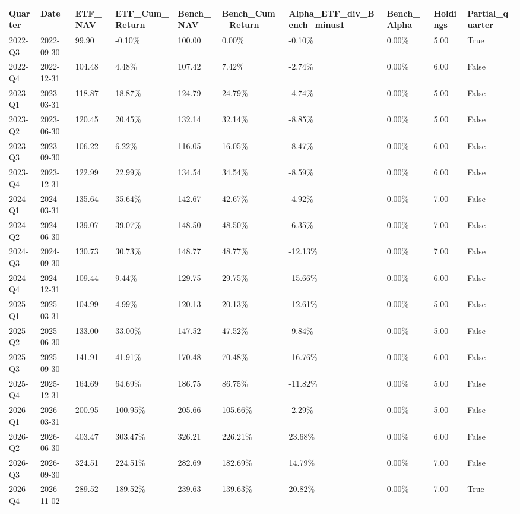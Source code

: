 \begin{longtable}{llllllllll}
Quarter & Date & ETF\_NAV & ETF\_Cum\_Return & Bench\_NAV & Bench\_Cum\_Return & Alpha\_ETF\_div\_Bench\_minus1 & Bench\_Alpha & Holdings & Partial\_quarter \\
\hline
2022-Q3 & 2022-09-30 & 99.90 & -0.10\% & 100.00 & 0.00\% & -0.10\% & 0.00\% & 5.00 & True \\
2022-Q4 & 2022-12-31 & 104.48 & 4.48\% & 107.42 & 7.42\% & -2.74\% & 0.00\% & 6.00 & False \\
2023-Q1 & 2023-03-31 & 118.87 & 18.87\% & 124.79 & 24.79\% & -4.74\% & 0.00\% & 5.00 & False \\
2023-Q2 & 2023-06-30 & 120.45 & 20.45\% & 132.14 & 32.14\% & -8.85\% & 0.00\% & 5.00 & False \\
2023-Q3 & 2023-09-30 & 106.22 & 6.22\% & 116.05 & 16.05\% & -8.47\% & 0.00\% & 6.00 & False \\
2023-Q4 & 2023-12-31 & 122.99 & 22.99\% & 134.54 & 34.54\% & -8.59\% & 0.00\% & 6.00 & False \\
2024-Q1 & 2024-03-31 & 135.64 & 35.64\% & 142.67 & 42.67\% & -4.92\% & 0.00\% & 7.00 & False \\
2024-Q2 & 2024-06-30 & 139.07 & 39.07\% & 148.50 & 48.50\% & -6.35\% & 0.00\% & 7.00 & False \\
2024-Q3 & 2024-09-30 & 130.73 & 30.73\% & 148.77 & 48.77\% & -12.13\% & 0.00\% & 7.00 & False \\
2024-Q4 & 2024-12-31 & 109.44 & 9.44\% & 129.75 & 29.75\% & -15.66\% & 0.00\% & 6.00 & False \\
2025-Q1 & 2025-03-31 & 104.99 & 4.99\% & 120.13 & 20.13\% & -12.61\% & 0.00\% & 5.00 & False \\
2025-Q2 & 2025-06-30 & 133.00 & 33.00\% & 147.52 & 47.52\% & -9.84\% & 0.00\% & 5.00 & False \\
2025-Q3 & 2025-09-30 & 141.91 & 41.91\% & 170.48 & 70.48\% & -16.76\% & 0.00\% & 6.00 & False \\
2025-Q4 & 2025-12-31 & 164.69 & 64.69\% & 186.75 & 86.75\% & -11.82\% & 0.00\% & 5.00 & False \\
2026-Q1 & 2026-03-31 & 200.95 & 100.95\% & 205.66 & 105.66\% & -2.29\% & 0.00\% & 5.00 & False \\
2026-Q2 & 2026-06-30 & 403.47 & 303.47\% & 326.21 & 226.21\% & 23.68\% & 0.00\% & 6.00 & False \\
2026-Q3 & 2026-09-30 & 324.51 & 224.51\% & 282.69 & 182.69\% & 14.79\% & 0.00\% & 7.00 & False \\
2026-Q4 & 2026-11-02 & 289.52 & 189.52\% & 239.63 & 139.63\% & 20.82\% & 0.00\% & 7.00 & True \\
\end{longtable}
